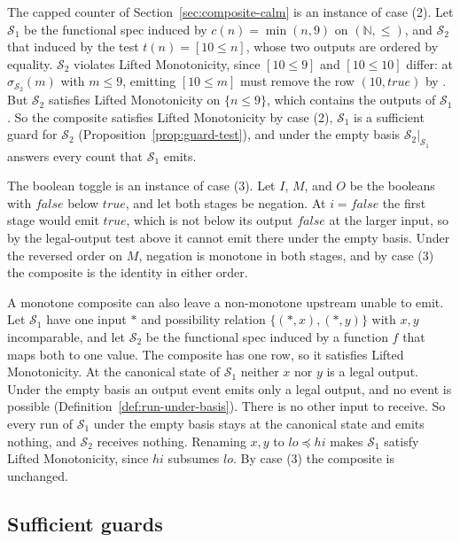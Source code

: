 The capped counter of Section~\ref{sec:composite-calm} is an instance of case
(2).  Let $\mathcal S_1$ be the functional spec induced by $c(n)=\min(n,9)$ on
$(\mathbb N,\le)$, and $\mathcal S_2$ that induced by the test $t(n)=[10\le
n]$, whose two outputs are ordered by equality.  $\mathcal S_2$ violates
Lifted Monotonicity, since $[10\le 9]$ and $[10\le 10]$ differ: at
$\sigma_{\mathcal S_2}(m)$ with $m\le 9$, emitting $[10\le m]$ must remove the
row $(10,\mathit{true})$ by \commitment.  But $\mathcal S_2$ satisfies Lifted
Monotonicity on $\{n\le 9\}$, which contains the outputs of $\mathcal S_1$.
So the composite satisfies Lifted Monotonicity by case (2), $\mathcal S_1$ is a
sufficient guard for $\mathcal S_2$ (Proposition~\ref{prop:guard-test}), and under the empty basis
$\mathcal S_2|_{\mathcal S_1}$ answers every count that $\mathcal S_1$ emits.

The boolean toggle is an instance of case (3).  Let $I$, $M$, and $O$ be the
booleans with $\mathit{false}$ below $\mathit{true}$, and let both stages be
negation.  At $i=\mathit{false}$ the first stage would emit $\mathit{true}$,
which is not below its output $\mathit{false}$ at the larger input, so by the
legal-output test above it cannot emit there under the empty basis.  Under the
reversed order on $M$, negation is monotone in both stages, and by case (3)
the composite is the identity in either order.

A monotone composite can also leave a non-monotone upstream unable to emit.
Let $\mathcal S_1$ have one input $*$ and possibility relation
$\{(*,x),(*,y)\}$ with $x,y$ incomparable, and let $\mathcal S_2$ be the
functional spec induced by a function $f$ that maps both to one value.  The
composite has one row, so it satisfies Lifted Monotonicity.  At the canonical
state of $\mathcal S_1$ neither $x$ nor $y$ is a legal output.  Under the
empty basis an output event emits only a legal output, and no \commitment
event is possible (Definition~\ref{def:run-under-basis}).  There is no other
input to receive.  So every run of $\mathcal S_1$ under the empty basis stays at the canonical
state and emits nothing, and $\mathcal S_2$ receives nothing.  Renaming $x,y$
to $\mathit{lo}\preceq\mathit{hi}$ makes $\mathcal S_1$ satisfy Lifted
Monotonicity, since $\mathit{hi}$ subsumes $\mathit{lo}$.  By case (3) the
composite is unchanged.

\subsection{Sufficient guards}

